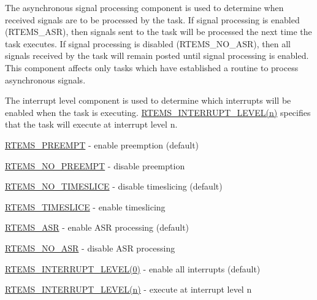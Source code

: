The asynchronous signal processing component is used to determine when received signals are to be processed by the task. If signal processing is enabled ({\ttfamily R\+T\+E\+M\+S\+\_\+\+A\+SR}), then signals sent to the task will be processed the next time the task executes. If signal processing is disabled ({\ttfamily R\+T\+E\+M\+S\+\_\+\+N\+O\+\_\+\+A\+SR}), then all signals received by the task will remain posted until signal processing is enabled. This component affects only tasks which have established a routine to process asynchronous signals.

The interrupt level component is used to determine which interrupts will be enabled when the task is executing. {\ttfamily \mbox{\hyperlink{group__ClassicModes_ga39a1f6143434df1c0bae66cbb083de94}{R\+T\+E\+M\+S\+\_\+\+I\+N\+T\+E\+R\+R\+U\+P\+T\+\_\+\+L\+E\+V\+E\+L(n)}}} specifies that the task will execute at interrupt level n.


\begin{DoxyItemize}
\item \mbox{\hyperlink{group__ClassicModes_gaf10ca77d8ec042125324421ae1c307a9}{R\+T\+E\+M\+S\+\_\+\+P\+R\+E\+E\+M\+PT}} -\/ enable preemption (default)
\item \mbox{\hyperlink{group__ClassicModes_gaabb8ccb34ba1b5c0497f370781630c88}{R\+T\+E\+M\+S\+\_\+\+N\+O\+\_\+\+P\+R\+E\+E\+M\+PT}} -\/ disable preemption
\item \mbox{\hyperlink{group__ClassicModes_ga140fecfdfeab8c819c7c7c20bd79f8ed}{R\+T\+E\+M\+S\+\_\+\+N\+O\+\_\+\+T\+I\+M\+E\+S\+L\+I\+CE}} -\/ disable timeslicing (default)
\item \mbox{\hyperlink{group__ClassicModes_ga0559c65edac08e290536d0c211171a7e}{R\+T\+E\+M\+S\+\_\+\+T\+I\+M\+E\+S\+L\+I\+CE}} -\/ enable timeslicing
\item \mbox{\hyperlink{group__ClassicModes_ga70cd9a55b09454b95608db57279607cd}{R\+T\+E\+M\+S\+\_\+\+A\+SR}} -\/ enable A\+SR processing (default)
\item \mbox{\hyperlink{group__ClassicModes_gad67a5c6d7c644641c29a800b327549bb}{R\+T\+E\+M\+S\+\_\+\+N\+O\+\_\+\+A\+SR}} -\/ disable A\+SR processing
\item \mbox{\hyperlink{group__ClassicModes_ga39a1f6143434df1c0bae66cbb083de94}{R\+T\+E\+M\+S\+\_\+\+I\+N\+T\+E\+R\+R\+U\+P\+T\+\_\+\+L\+E\+V\+E\+L(0)}} -\/ enable all interrupts (default)
\item \mbox{\hyperlink{group__ClassicModes_ga39a1f6143434df1c0bae66cbb083de94}{R\+T\+E\+M\+S\+\_\+\+I\+N\+T\+E\+R\+R\+U\+P\+T\+\_\+\+L\+E\+V\+E\+L(n)}} -\/ execute at interrupt level n
\end{DoxyItemize}


